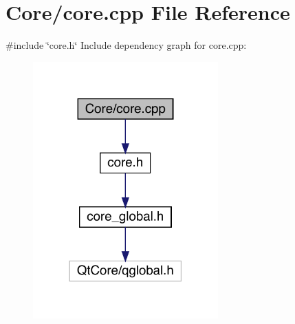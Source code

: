\hypertarget{a00011}{}\section{Core/core.cpp File Reference}
\label{a00011}
{\ttfamily \#include \char`\"{}core.\+h\char`\"{}}\newline
Include dependency graph for core.\+cpp\+:
\nopagebreak
\begin{figure}[H]
\begin{center}
\leavevmode
\includegraphics[width=202pt]{df/d86/a00012}
\end{center}
\end{figure}
